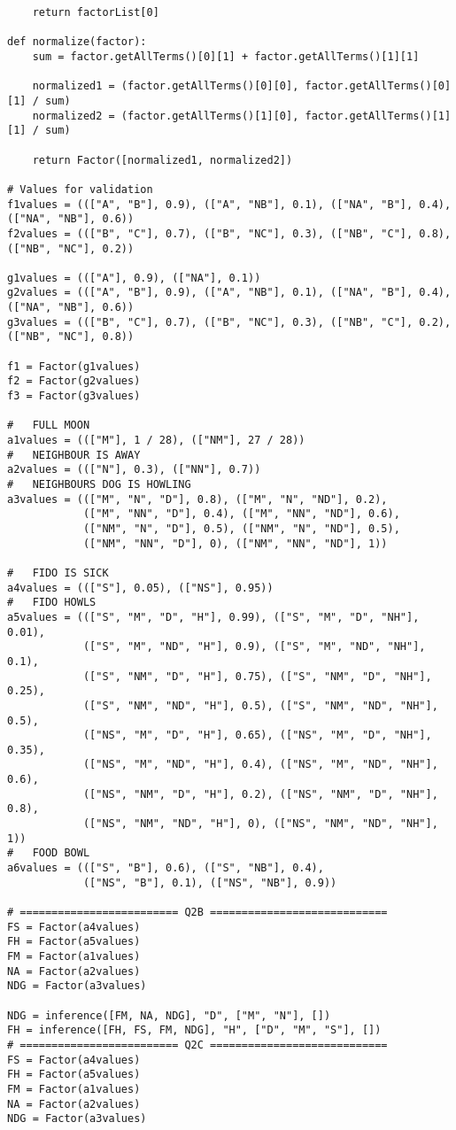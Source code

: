 \documentclass{article}
\begin{document}
\begin{titlepage}
\begin{lstlisting}
    return factorList[0]

def normalize(factor):
    sum = factor.getAllTerms()[0][1] + factor.getAllTerms()[1][1]

    normalized1 = (factor.getAllTerms()[0][0], factor.getAllTerms()[0][1] / sum)
    normalized2 = (factor.getAllTerms()[1][0], factor.getAllTerms()[1][1] / sum)

    return Factor([normalized1, normalized2])

# Values for validation
f1values = ((["A", "B"], 0.9), (["A", "NB"], 0.1), (["NA", "B"], 0.4), (["NA", "NB"], 0.6))
f2values = ((["B", "C"], 0.7), (["B", "NC"], 0.3), (["NB", "C"], 0.8), (["NB", "NC"], 0.2))

g1values = ((["A"], 0.9), (["NA"], 0.1))
g2values = ((["A", "B"], 0.9), (["A", "NB"], 0.1), (["NA", "B"], 0.4), (["NA", "NB"], 0.6))
g3values = ((["B", "C"], 0.7), (["B", "NC"], 0.3), (["NB", "C"], 0.2), (["NB", "NC"], 0.8))

f1 = Factor(g1values)
f2 = Factor(g2values)
f3 = Factor(g3values)

#   FULL MOON
a1values = ((["M"], 1 / 28), (["NM"], 27 / 28))
#   NEIGHBOUR IS AWAY
a2values = ((["N"], 0.3), (["NN"], 0.7))
#   NEIGHBOURS DOG IS HOWLING
a3values = ((["M", "N", "D"], 0.8), (["M", "N", "ND"], 0.2),
            (["M", "NN", "D"], 0.4), (["M", "NN", "ND"], 0.6),
            (["NM", "N", "D"], 0.5), (["NM", "N", "ND"], 0.5),
            (["NM", "NN", "D"], 0), (["NM", "NN", "ND"], 1))

#   FIDO IS SICK
a4values = ((["S"], 0.05), (["NS"], 0.95))
#   FIDO HOWLS
a5values = ((["S", "M", "D", "H"], 0.99), (["S", "M", "D", "NH"], 0.01),
            (["S", "M", "ND", "H"], 0.9), (["S", "M", "ND", "NH"], 0.1),
            (["S", "NM", "D", "H"], 0.75), (["S", "NM", "D", "NH"], 0.25),
            (["S", "NM", "ND", "H"], 0.5), (["S", "NM", "ND", "NH"], 0.5),
            (["NS", "M", "D", "H"], 0.65), (["NS", "M", "D", "NH"], 0.35),
            (["NS", "M", "ND", "H"], 0.4), (["NS", "M", "ND", "NH"], 0.6),
            (["NS", "NM", "D", "H"], 0.2), (["NS", "NM", "D", "NH"], 0.8),
            (["NS", "NM", "ND", "H"], 0), (["NS", "NM", "ND", "NH"], 1))
#   FOOD BOWL
a6values = ((["S", "B"], 0.6), (["S", "NB"], 0.4),
            (["NS", "B"], 0.1), (["NS", "NB"], 0.9))

# ========================= Q2B ============================
FS = Factor(a4values)
FH = Factor(a5values)
FM = Factor(a1values)
NA = Factor(a2values)
NDG = Factor(a3values)

NDG = inference([FM, NA, NDG], "D", ["M", "N"], [])
FH = inference([FH, FS, FM, NDG], "H", ["D", "M", "S"], [])
# ========================= Q2C ============================
FS = Factor(a4values)
FH = Factor(a5values)
FM = Factor(a1values)
NA = Factor(a2values)
NDG = Factor(a3values)


\end{lstlisting}
\end{titlepage}
\end{document}
